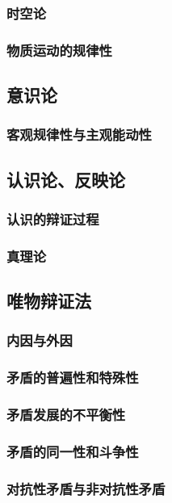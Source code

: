 \documentclass[UTF8]{../RepresentationUniverse}
\begin{document}
    \subsubsection{时空论}
    \subsubsection{物质运动的规律性}

\subsection{意识论}
    \subsubsection{客观规律性与主观能动性}

\subsection{认识论、反映论}
    \subsubsection{认识的辩证过程}
    \subsubsection{真理论}

\subsection{唯物辩证法}
    \subsubsection{内因与外因}
    \subsubsection{矛盾的普遍性和特殊性}
    \subsubsection{矛盾发展的不平衡性}
    \subsubsection{矛盾的同一性和斗争性}
    \subsubsection{对抗性矛盾与非对抗性矛盾}
\end{document}
